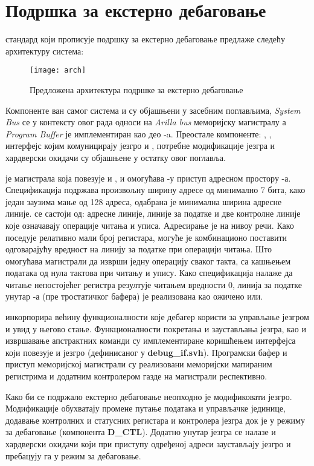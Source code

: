 \chapter{Подршка за екстерно дебаговање}

 стандард који прописује подршку за екстерно дебаговање \cite{debug_spec} предлаже следећу архитектуру система:

\begin{figure}[h!]
	\centering
	\texttt{[image: arch]}
	\caption{Предложена архитектура подршке за екстерно дебаговање \cite{debug_spec}}
	\label{fig:arch}
\end{figure}

Компоненте ван самог система и  су објашњени у засебним поглављима, \textit{System Bus} се у контексту овог рада односи на \textit{Arilla bus} меморијску магистралу а \textit{Program Buffer} је имплементиран као део -a. Преостале компоненте: , , интерфејс којим комуницирају језгро и , потребне модификације језгра и хардверски окидачи су објашњене у остатку овог поглавља.

 је магистрала која повезује  и , и омогућава -у приступ адресном простору -а. Спецификација подржава произвољну ширину адресе од минимално 7 бита, како један  заузима мање од 128 адреса, одабрана је минимална ширина адресне линије.  се састоји од: адресне линије, линије за податке и две контролне линије које означавају операције читања и уписа. Адресирање је на нивоу речи. Како  поседује релативно мали број регистара, могуће је комбинационо поставити одговарајућу вредност на линију за податке при операцији читања. Што омогућава магистрали да изврши једну операцију сваког такта, са кашњењем података од нула тактова при читању и упису. Како спецификација налаже да читање непостојећег регистра резултује читањем вредности 0, линија за податке унутар -а (пре тростатичког бафера) је реализована као ожичено или.

 инкорпорира већину функционалности које дебагер користи за управљање језгром и увид у његово стање. Функционалности покретања и заустављања језгра, као и извршавање апстрактних команди су имплементиране коришћењем интерфејса који повезује  и језгро (дефинисаног у \textbf{debug\_if.svh}). Програмски бафер и приступ меморијској магистрали су реализовани меморијски мапираним регистрима и додатним контролером газде на магистрали респективно. 

Како би се подржало екстерно дебаговање неопходно је модификовати језгро. Модификације обухватају промене путање података и управљачке јединице, додавање контролних и статусних регистара и контролера језгра док је у режиму за дебаговање (компонента \textbf{D\_CTL}). Додатно унутар језгра се налазе и хардверски окидачи који при приступу одређеној адреси заустављају језгро и пребацују га у режим за дебаговање. 

